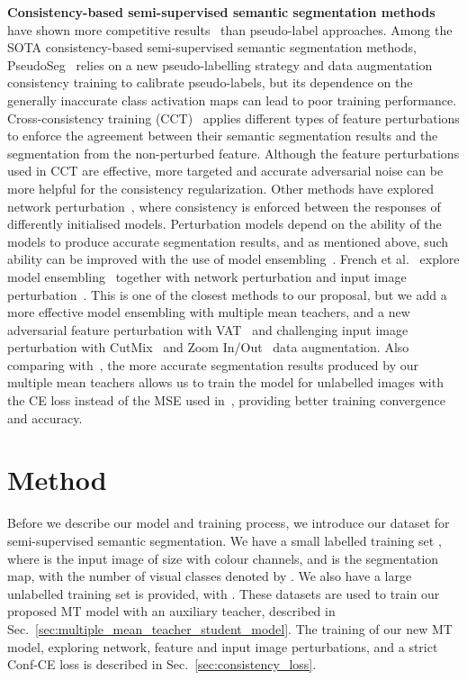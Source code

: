 \documentclass[10pt,twocolumn,letterpaper]{article}
\begin{document}
\noindent \textbf{Consistency-based semi-supervised semantic segmentation methods} have shown more competitive results~\cite{french2019semi, ouali2020semi, chen2021semi} than pseudo-label approaches. 
Among the SOTA consistency-based semi-supervised semantic segmentation methods, PseudoSeg~\cite{zou2020pseudoseg} 
relies on a new pseudo-labelling strategy and data augmentation consistency training to calibrate pseudo-labels, but its dependence on the generally inaccurate class activation maps can lead to poor training performance. 
Cross-consistency training (CCT)~\cite{ouali2020semi} applies different types of feature perturbations to enforce the agreement between their semantic segmentation results and the segmentation from the non-perturbed feature. Although the feature perturbations used in CCT are effective, more targeted and accurate adversarial noise can be more helpful for the consistency regularization.
Other methods have explored network perturbation~\cite{feng2020semi, ke2020guided, mendel2020semi, chen2021semi}, where consistency is enforced between the responses of differently initialised models.
Perturbation models depend on the ability of the models to produce accurate segmentation results, and as mentioned above, such ability can be improved with the use of model ensembling~\cite{tarvainen2017mean}. 
French et al.~\cite{french2019semi} 
explore model ensembling~\cite{tarvainen2017mean} together with network perturbation and input image perturbation~\cite{yun2019cutmix}. This is one of the closest methods to our proposal, but we add a more effective model ensembling with multiple mean teachers, and a new adversarial feature perturbation with VAT~\cite{miyato2018virtual} and challenging input image perturbation with CutMix~\cite{yun2019cutmix} and Zoom In/Out~\cite{lin2018multi, chen2016attention} 
data augmentation. 
Also comparing with~\cite{french2019semi}, the more accurate segmentation results produced by our multiple mean teachers allows us to train the model for unlabelled images with the CE loss instead of the MSE used in~\cite{french2019semi}, providing better training convergence and accuracy. 





\section{Method} 
\label{sec:method}



Before we describe our model and training process, we introduce our dataset for semi-supervised semantic segmentation. 
We have a small labelled training set , where  is the input image of size  with  colour channels, and  is the segmentation map, with the number of visual classes denoted by .  
We also have a large unlabelled training set  is provided, with . 
These datasets are used to train our proposed MT model with an auxiliary teacher, described in Sec.~\ref{sec:multiple_mean_teacher_student_model}.
The training of our new MT model, exploring network, feature and input image perturbations, and a strict Conf-CE loss is described in Sec.~\ref{sec:consistency_loss}. 
\end{document}
